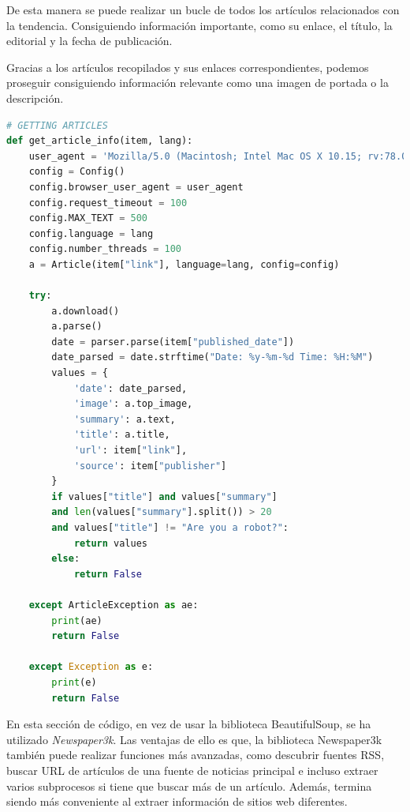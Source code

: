 De esta manera se puede realizar un bucle de todos los artículos relacionados con la tendencia. Consiguiendo información importante, como su enlace, el título, la editorial y la fecha de publicación.

\vspace{0.3cm}

Gracias a los artículos recopilados y sus enlaces correspondientes, podemos proseguir consiguiendo información relevante como una imagen de portada o la descripción.

\vspace{0.3cm}

\begin{lstlisting}[caption=Extracción de la información de las noticias,language=Python, mathescape=true]
# GETTING ARTICLES
def get_article_info(item, lang):
    user_agent = 'Mozilla/5.0 (Macintosh; Intel Mac OS X 10.15; rv:78.0) Gecko/20100101 Firefox/78.0'
    config = Config()
    config.browser_user_agent = user_agent
    config.request_timeout = 100
    config.MAX_TEXT = 500
    config.language = lang
    config.number_threads = 100
    a = Article(item["link"], language=lang, config=config)
    
    try:
        a.download()
        a.parse()
        date = parser.parse(item["published_date"])
        date_parsed = date.strftime("Date: %y-%m-%d Time: %H:%M")
        values = {
            'date': date_parsed,
            'image': a.top_image,
            'summary': a.text,
            'title': a.title,
            'url': item["link"],
            'source': item["publisher"]
        }
        if values["title"] and values["summary"] 
        and len(values["summary"].split()) > 20 
        and values["title"] != "Are you a robot?":
            return values
        else:
            return False
            
    except ArticleException as ae:
        print(ae)
        return False
        
    except Exception as e:
        print(e)
        return False
\end{lstlisting}

En esta sección de código, en vez de usar la biblioteca BeautifulSoup, se ha utilizado \textit{Newspaper3k}. Las ventajas de ello es que, la biblioteca Newspaper3k también puede realizar funciones más avanzadas, como descubrir fuentes RSS, buscar URL de artículos de una fuente de noticias principal e incluso extraer varios subprocesos si tiene que buscar más de un artículo. Además, termina siendo más conveniente al extraer información de sitios web diferentes.

